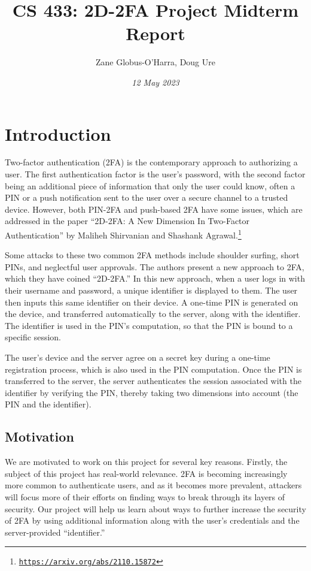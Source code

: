 \documentclass{article} %
\title{CS 433: 2D-2FA Project Midterm Report}
\author{Zane Globus-O'Harra, Doug Ure}
\date{\textit{12 May 2023}}
\begin{document}
\maketitle

\section{Introduction}

Two-factor authentication (2FA) is the contemporary approach to
authorizing a user. The first authentication factor is the user's
password, with the second factor being an additional piece of
information that only the user could know, often a PIN or a push
notification sent to the user over a secure channel to a trusted device. However, both
PIN-2FA and push-based 2FA have some issues, which are addressed in the
paper ``2D-2FA: A New Dimension In Two-Factor Authentication'' by
Maliheh Shirvanian and Shashank
Agrawal.\footnote{\href{https://arxiv.org/abs/2110.15872}{\texttt{https://arxiv.org/abs/2110.15872}}}

Some attacks to these two common 2FA methods include shoulder surfing,
short PINs, and neglectful user approvals. The authors present a new
approach to 2FA, which they have coined ``2D-2FA.'' In this new
approach, when a user logs in with their username and password, a
unique identifier is displayed to them. The user then inputs
this same identifier on their device. A one-time PIN is generated on the
device, and transferred automatically to the server, along with the
identifier. The identifier is used in the PIN's computation, so that the
PIN is bound to a specific session. 

The user's device and the server agree on a secret key during a one-time
registration process, which is also used in the PIN computation. Once
the PIN is transferred to the server, the server authenticates the
session associated with the identifier by verifying the PIN, thereby
taking two dimensions into account (the PIN and the identifier).

\subsection{Motivation}

We are motivated to work on this project for several key reasons.
Firstly, the subject of this project has real-world relevance. 2FA is
becoming increasingly more common to authenticate users, and as it
becomes more prevalent, attackers will focus more of their efforts on
finding ways to break through its layers of security. Our project will
help us learn about ways to further increase the security of 2FA by
using additional information along with the user's credentials and the
server-provided ``identifier.''
\end{document}
